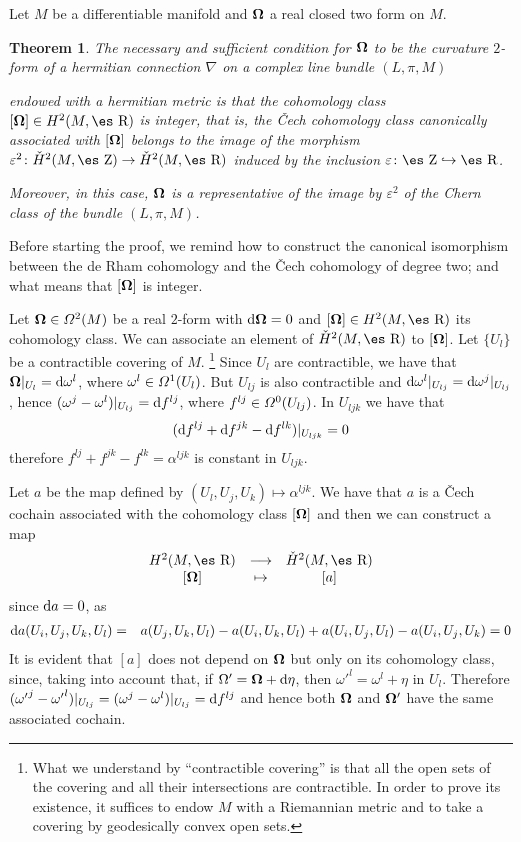 \documentclass[12pt]{article}
\theoremstyle{plain}
\newtheorem{teor}{Theorem}
\def\beann{\begin{eqnarray*}}
\def\eeann{\end{eqnarray*}}
\def\d{{\rm d}}
\def\curv{{\bf \Omega}}
\def\Zahl{\mbox{\es Z}}
\def\Real{\mbox{\es R}}
\begin{document}
Let $M$ be a differentiable manifold and $\curv $ a real closed two form
on $M$.

\begin{teor}
The necessary and sufficient condition for $\curv $ to be the curvature
$2$-form
of a hermitian connection $\nabla$ on a complex line bundle $(L,\pi ,M)$

endowed with a hermitian metric is that the cohomology class
$[\curv ] \in H^2(M,\Real )$ is integer, that is, the \v{C}ech
cohomology class
canonically associated with $[\curv ]$ belongs to the image of the
morphism
$\varepsilon^2 \colon \check{H}^2(M,\Zahl ) \to \check{H}^2(M,\Real )$
induced by the inclusion $\varepsilon \colon \Zahl \hookrightarrow
\Real$.

Moreover, in this case, $\curv $ is a representative of the image by
$\varepsilon^2$
of the Chern class of the bundle $(L,\pi ,M)$.
\label{cce}
\end{teor}

Before starting the proof, we remind how to construct
the canonical isomorphism between the
de Rham cohomology and the \v{C}ech cohomology
of degree two; and what means that $[\curv ]$ is integer.

Let $\curv  \in {\mit\Omega}^2(M)$ be
a real $2$-form with $\d\curv  = 0$ and
$[\curv ] \in H^2(M,\Real )$ its cohomology class.
We can associate an element of $\check{H}^2(M,\Real )$ to $[\curv ]$.
Let $\{ U_l \}$ be a contractible covering of $M$.%
\footnote
{What we understand by ``contractible covering'' is that
all the open sets of the covering
and all their intersections are contractible.
In order to prove its existence, it suffices to endow $M$ with a
Riemannian metric and to take a
covering by geodesically convex open sets.}
Since $U_l$ are contractible, we have that
$\curv  \vert_{U_l} = \d \omega^l $,
where $\omega^l  \in {\mit\Omega}^1(U_l)$.
But $U_{l j}$ is also contractible and
$\d\omega^l  \vert_{U_{l j}} = \d\omega^j \vert_{U_{l j}}$,
hence $(\omega^j - \omega^l )\vert_{U_{l j}} = \d f^{l j}$,
where $f^{l j} \in {\mit\Omega}^0(U_{l j})$. In $U_{l jk}$ we have that
$$
(\d f^{l j} + \d f^{jk} - \d f^{l k})\vert_{U_{l jk}} =0
$$
therefore $f^{l j} + f^{jk} - f^{l k} = \alpha^{l jk}$ is constant in
$U_{l jk}$.

Let $a$ be the map defined by
$(U_l,U_j,U_k) \mapsto \alpha^{l jk}$.
We have that $a$ is a \v{C}ech cochain associated with the
cohomology class $[\curv ]$ and then we can construct a map
$$
\begin{array}{ccc}
H^2(M,\Real ) & \longrightarrow & \check{H}^2(M,\Real )
\nopagebreak
\\ {}
[\curv ] & \mapsto & [a]
\end{array}
$$
since $\d a = 0$, as
\beann
\d a (U_i,U_j,U_k,U_l)
&=&
a(U_j,U_k,U_l) - a(U_i,U_k,U_l) + a(U_i,U_j,U_l) - a(U_i,U_j,U_k) = 0
\eeann
It is evident that $[a]$ does not depend
on $\curv $ but only on its cohomology class,
since, taking into account that, if $\Omega' = \curv  + \d \eta$,
then ${\omega'}^l = \omega^l  + \eta$ in $U_l$. Therefore
$({\omega'}^j - {\omega'}^l)\vert_{U_{l j}} =
(\omega^j - \omega^l )\vert_{U_{l j}} = \d f^{l j}$
and hence both $\curv $ and ${\bf \Omega'}$
have the same associated cochain.
\end{document}
